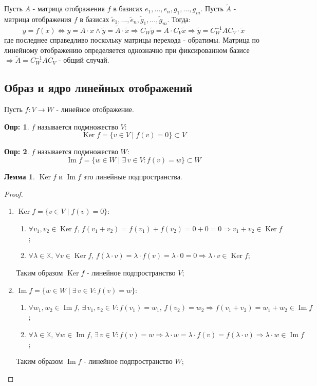 \documentclass[12pt]{article}
\newcommand{\MK}{\mathbb{K}}
\theoremstyle{definition}
\newtheorem{defn}{Опр:}
\newtheorem{lemma}{Лемма}
\DeclareMathOperator{\Ker}{Ker}
\DeclareMathOperator{\Ima}{Im}
\newcommand{\wte}[1]{\widetilde{#1}}
\begin{document}
Пусть $A$ - матрица отображения $f$ в базисах $e_1,\dotsc, e_n, g_1,\dotsc, g_m$. Пусть $\wte{A}$ - матрица отображения $f$ в базисах $\wte{e}_1,\dotsc, \wte{e}_n, \wte{g}_1,\dotsc, \wte{g}_m$. Тогда: 
$$
	y =f(x) \Leftrightarrow y = A{\cdot}x \wedge \wte{y} = \wte{A}{\cdot}\wte{x}  \Rightarrow C_W\wte{y} = A{\cdot}C_V\wte{x} \Rightarrow \wte{y} = C_W^{-1}AC_V {\cdot} \wte{x}
$$
где последнее справедливо поскольку матрицы перехода - обратимы. Матрица по линейному отображению определяется однозначно при фиксированном базисе $\Rightarrow \wte{A} = C_W^{-1}AC_V$ - общий случай.

\subsection*{Образ и ядро линейных отображений}
Пусть $f \colon V \to W$ - линейное отображение.
\begin{defn}
	 $f$ называется подмножество $V$: 
	$$\Ker f = \{v \in V \mid f(v) = 0\} \subset V$$
\end{defn}
\begin{defn}
	 $f$ называется подмножество $W$: 
	$$\Ima f = \{w \in W \mid \exists \, v \in V \colon f(v) = w \} \subset W$$
\end{defn}
\begin{lemma}
	$\Ker f$ и $\Ima f$ это линейные подпространства.
\end{lemma}
\begin{proof}\hfill
	\begin{enumerate}[label ={\arabic*)}]
		\item $\Ker f = \{v \in V \mid f(v) = 0\}$:
		\begin{enumerate}[label ={(\arabic*)}]
			\item $\forall v_1, v_2 \in \Ker f, \, f(v_1 + v_2) = f(v_1) + f(v_2) = 0 + 0 = 0 \Rightarrow v_1 + v_2 \in \Ker f$;
			\item $\forall \lambda \in \MK, \, \forall v \in \Ker f, \, f(\lambda {\cdot} v) = \lambda{\cdot}f(v) = \lambda{\cdot}0 = 0 \Rightarrow \lambda {\cdot} v \in \Ker f$;
		\end{enumerate}
		Таким образом $\Ker f$ - линейное подпространство $V$;
		\item $\Ima f = \{w \in W \mid \exists \, v \in V \colon f(v) = w \}$:
		\begin{enumerate}[label ={(\arabic*)}]
			\item $\forall w_1, w_2 \in \Ima f, \, \exists \, v_1, v_2 \in V \colon f(v_1) = w_1, \, f(v_2) = w_2 \Rightarrow f(v_1 + v_2) = w_1 + w_2 \in \Ima f$;
			\item $\forall \lambda \in \MK, \, \forall w \in \Ima f, \, \exists \, v \in V \colon f(v) = w \Rightarrow \lambda{\cdot}w = \lambda{\cdot}f(v) = f(\lambda {\cdot} v) \Rightarrow \lambda{\cdot} w \in \Ima f$;
		\end{enumerate}
		Таким образом $\Ima f$ - линейное подпространство $W$;
	\end{enumerate}
\end{proof}
\end{document}
